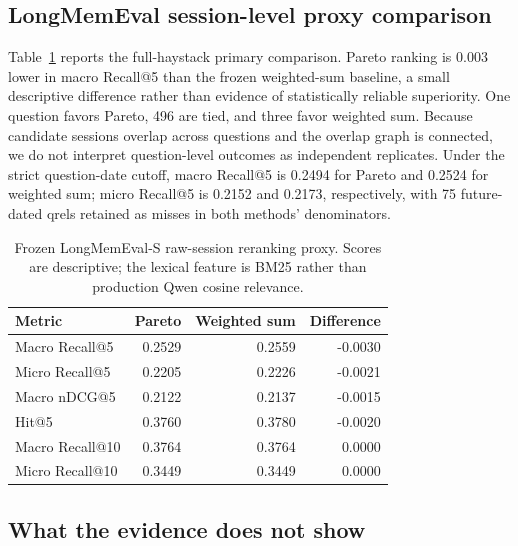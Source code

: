 \documentclass[review,12pt]{elsarticle}
\begin{document}
\subsection{LongMemEval session-level proxy comparison}
\label{sec:longmemeval}

Table~\ref{tab:longmemeval} reports the full-haystack primary comparison. Pareto ranking is 0.003 lower in macro Recall@5 than the frozen weighted-sum baseline, a small descriptive difference rather than evidence of statistically reliable superiority. One question favors Pareto, 496 are tied, and three favor weighted sum. Because candidate sessions overlap across questions and the overlap graph is connected, we do not interpret question-level outcomes as independent replicates. Under the strict question-date cutoff, macro Recall@5 is 0.2494 for Pareto and 0.2524 for weighted sum; micro Recall@5 is 0.2152 and 0.2173, respectively, with 75 future-dated qrels retained as misses in both methods' denominators.

\begin{table}[t]
\centering
\caption{Frozen LongMemEval-S raw-session reranking proxy. Scores are descriptive; the lexical feature is BM25 rather than production Qwen cosine relevance.}
\label{tab:longmemeval}
\begin{tabular}{lrrr}
\toprule
Metric & Pareto & Weighted sum & Difference \\
\midrule
Macro Recall@5 & 0.2529 & 0.2559 & -0.0030 \\
Micro Recall@5 & 0.2205 & 0.2226 & -0.0021 \\
Macro nDCG@5 & 0.2122 & 0.2137 & -0.0015 \\
Hit@5 & 0.3760 & 0.3780 & -0.0020 \\
Macro Recall@10 & 0.3764 & 0.3764 & 0.0000 \\
Micro Recall@10 & 0.3449 & 0.3449 & 0.0000 \\
\bottomrule
\end{tabular}
\end{table}

\subsection{What the evidence does not show}
\end{document}
